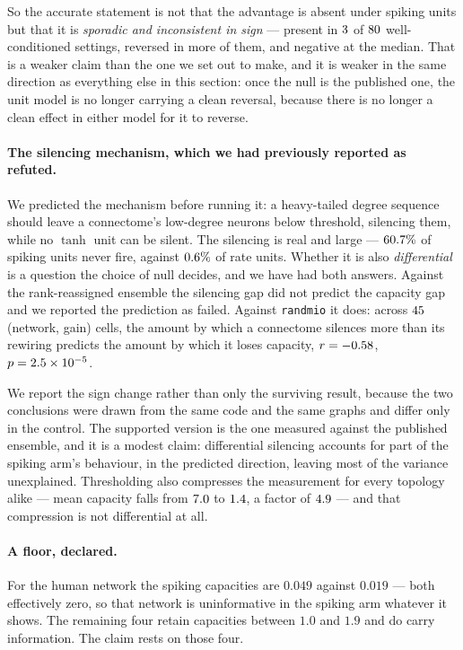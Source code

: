 So the accurate statement is not that the advantage is absent under spiking units but
that it is \emph{sporadic and inconsistent in sign} --- present in $3$ of
$80$ well-conditioned settings, reversed in more of them, and negative at the
median. That is a weaker claim than the one we set out to make, and it is weaker in the
same direction as everything else in this section: once the null is the published one,
the unit model is no longer carrying a clean reversal, because there is no longer a clean
effect in either model for it to reverse.

\paragraph{The silencing mechanism, which we had previously reported as refuted.}
We predicted the mechanism before running it: a heavy-tailed degree sequence should leave
a connectome's low-degree neurons below threshold, silencing them, while no $\tanh$ unit
can be silent. The silencing is real and large --- $60.7\%$ of spiking units
never fire, against $0.6\%$ of rate units. Whether it is also \emph{differential}
is a question the choice of null decides, and we have had both answers. Against the
rank-reassigned ensemble the silencing gap did not predict the capacity gap and we
reported the prediction as failed. Against \texttt{randmio} it does: across
$45$ (network, gain) cells, the amount by which a connectome silences more
than its rewiring predicts the amount by which it loses capacity,
$r = -0.58$, $p = 2.5 \times 10^{-5}$.

We report the sign change rather than only the surviving result, because the two
conclusions were drawn from the same code and the same graphs and differ only in the
control. The supported version is the one measured against the published ensemble, and it
is a modest claim: differential silencing accounts for part of the spiking arm's
behaviour, in the predicted direction, leaving most of the variance unexplained.
Thresholding also compresses the measurement for every topology alike --- mean capacity
falls from $7.0$ to $1.4$, a factor of $4.9$ --- and that
compression is not differential at all.

\paragraph{A floor, declared.}
For the human network the spiking capacities are $0.049$ against $0.019$ --- both
effectively zero, so that network is uninformative in the spiking arm whatever it shows.
The remaining four retain capacities between $1.0$ and $1.9$ and do carry information.
The claim rests on those four.

